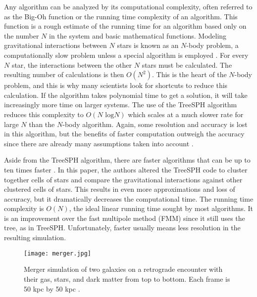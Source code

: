 \documentclass[11pt]{article} %
\begin{document}
	Any algorithm can be analyzed by its computational complexity, often referred to as the Big-Oh function or the running time complexity of an algorithm. This function is a rough estimate of the running time for an algorithm based only on the number $N$ in the system and basic mathematical functions. Modeling gravitational interactions between $N$ stars is known as an $N$-body problem, a computationally slow problem unless a special algorithm is employed \cite{algorithm}. For every $N$ star, the interactions between the other $N$ stars must be calculated. The resulting number of calculations is then $O(N^2)$. This is the heart of the $N$-body problem, and this is why many scientists look for shortcuts to reduce this calculation. If the algorithm takes polynomial time to get a solution, it will take increasingly more time on larger systems. The use of the TreeSPH algorithm reduces this complexity to $O(N\text{ log}N)$ which scales at a much slower rate for large $N$ than the $N$-body algorithm. Again, some resolution and accuracy is lost in this algorithm, but the benefits of faster computation outweigh the accuracy since there are already many assumptions taken into account \cite{algorithm}.

	Aside from the TreeSPH algorithm, there are faster algorithms that can be up to ten times faster \cite{improvedalgorithm}. In this paper, the authors altered the TreeSPH code to cluster together cells of stars and compare the gravitational interactions against other clustered cells of stars. This results in even more approximations and loss of accuracy, but it dramatically decreases the computational time. The running time complexity is $O(N)$, the ideal linear running time sought by most algorithms. It is an improvement over the fast multipole method (FMM) since it still uses the tree, as in TreeSPH. Unfortunately, faster usually means less resolution in the resulting simulation.

\begin{figure}
  \begin{center}
    \texttt{[image: merger.jpg]}
    \caption{Merger simulation of two galaxies on a retrograde encounter with their gas, stars, and dark matter from top to bottom. Each frame is 50 kpc by 50 kpc \cite{mergerstats}.}
  \end{center}
\end{figure}
\end{document}
